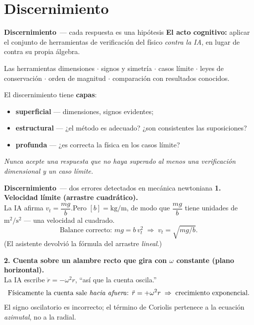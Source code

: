 \documentclass[aspectratio=169,11pt]{beamer}
\newcommand{\Dis}{\textcolor{Cdis}{\textbf{Discernimiento}}}
\begin{document}
\section{\texorpdfstring{\textcolor{Cdis}{Discernimiento}}{Discernimiento}}

\begin{frame}[shrink=15]{\Dis\ --- cada respuesta es una hipótesis}
  \textbf{El acto cognitivo:} aplicar el conjunto de herramientas de verificación del
  físico \emph{contra la IA}, en lugar de contra su propia álgebra.
  \vspace{0.4em}
  \begin{block}{Las herramientas}
    dimensiones $\cdot$ signos y simetría $\cdot$ casos límite $\cdot$ leyes de
    conservación $\cdot$ orden de magnitud $\cdot$ comparación con resultados conocidos.
  \end{block}
  El discernimiento tiene \textbf{capas}:
  \begin{itemize}
    \item \textbf{superficial} --- dimensiones, signos evidentes;
    \item \textbf{estructural} --- ¿el método es adecuado? ¿son consistentes las
          suposiciones?
    \item \textbf{profunda} --- ¿es correcta la física en los casos límite?
  \end{itemize}
  \begin{center}\small\itshape Nunca acepte una respuesta que no haya superado al menos
  una verificación dimensional y un caso límite.\end{center}
\end{frame}

\begin{frame}{\Dis\ --- dos errores detectados en mecánica newtoniana}
  \textbf{1. Velocidad límite (arrastre cuadrático).}\\
  La IA afirma $v_t=\dfrac{mg}{b}$.\quad Pero $[b]=\mathrm{kg/m}$, de modo que
  $\dfrac{mg}{b}$ tiene unidades de $\mathrm{m^2/s^2}$ --- una \alert{velocidad al
  cuadrado}.
  \[
    \text{Balance correcto: } mg=b\,v_t^2 \;\Rightarrow\; v_t=\sqrt{mg/b}.
  \]
  \footnotesize (El asistente devolvió la fórmula del arrastre \emph{lineal}.)
  \vspace{0.7em}\normalsize

  \textbf{2. Cuenta sobre un alambre recto que gira con $\omega$ constante (plano
  horizontal).}\\
  La IA escribe $\ddot r=-\omega^2 r$, ``así que la cuenta oscila.''
  \[
    \text{Físicamente la cuenta sale \emph{hacia afuera}: } \ddot r=+\omega^2 r
    \;\Rightarrow\; \text{crecimiento exponencial.}
  \]
  \footnotesize El signo oscilatorio es incorrecto; el término de Coriolis pertenece a
  la ecuación \emph{azimutal}, no a la radial.
\end{frame}
\end{document}
